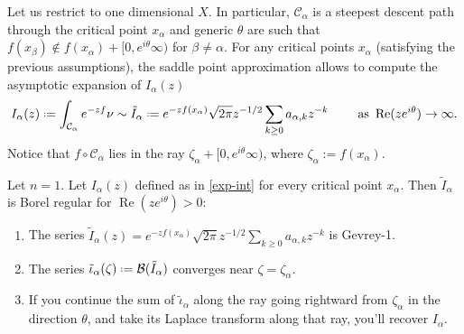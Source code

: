 \documentclass[11pt,a4paper,twoside,leqno,noamsfonts]{amsart}
\numberwithin{equation}{section}
\begin{document}
Let us restrict to one dimensional $X$. In particular,  $\mathcal{C}_\alpha$ is a steepest descent path through the critical point $x_\alpha$ and generic $\theta$ are such that $f(x_\beta)\notin f(x_\alpha)+[0,e^{i\theta}\infty)$ for $\beta\neq\alpha$. 
For any critical points $x_\alpha$ (satisfying the previous assumptions), the saddle point approximation allows to compute the asymptotic expansion of $I_\alpha(z)$ 
\begin{equation}\label{exp-int}
I_{\alpha}(z)\defeq\int_{\mathcal{C}_\alpha}e^{-zf}\nu\sim \tilde{I}_{\alpha}\defeq e^{-zf(x_\alpha)}\sqrt{2\pi} z^{-1/2}\sum_{k\geq 0}a_{\alpha,k}z^{-k} \qquad \text{ as } \operatorname{Re} (ze^{i\theta})\to\infty.
\end{equation}
Notice that $f \circ \mathcal{C}_\alpha$ lies in the ray $\zeta_\alpha +[0, e^{i\theta}\infty)$, where $\zeta_\alpha := f(x_\alpha)$.

\begin{theorem}[Theorem ??]\label{thm:maxim} Let $n=1$. Let ${I}_{\alpha}(z)$ defined as in \eqref{exp-int} for every critical point $x_\alpha$. Then $\tilde{I}_\alpha$ is Borel regular for $\operatorname{Re}(ze^{i\theta})>0$:
\begin{enumerate}
\item\label{int:series-gevrey} The series $\tilde{I}_\alpha(z)=e^{-zf(x_\alpha)}\sqrt{2\pi} z^{-1/2}\sum_{k\geq 0}a_{\alpha,k}z^{-k}$ is Gevrey-1.
\item\label{int:resum-converges} The series $\tilde{\iota}_\alpha(\zeta)\defeq\mathcal{B}(\tilde{I}_\alpha)$ converges near $\zeta=\zeta_{\alpha}$.
\item\label{int:resum-valid} If you continue the sum of $\tilde{\iota}_\alpha$ along the ray going rightward from $\zeta_\alpha$ in the direction $\theta$, and take its Laplace transform along that ray, you'll recover $I_\alpha$.
\end{enumerate}
\end{theorem}
\end{document}
